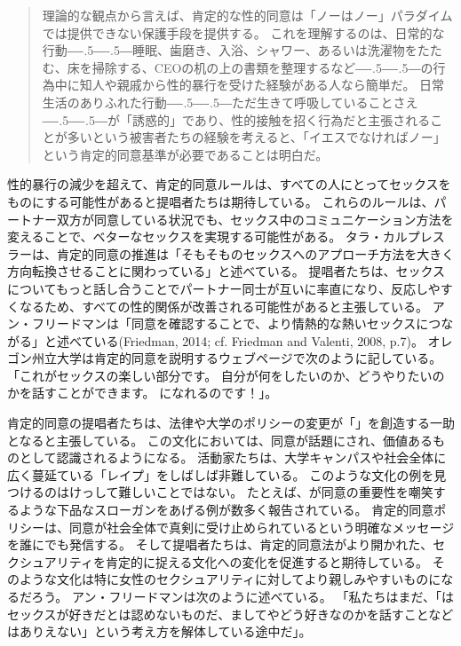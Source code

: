 \documentclass[paper=a4,book,openany]{jlreq}
\newcommand{\ig}[1]{}           %
\def\DDASH{―\kern-.5\zw―\kern-.5\zw―}
\begin{document}
\begin{quote}
  理論的な観点から言えば、肯定的な性的同意は「ノーはノー」パラダイムでは提供できない保護手段を提供する。
これを理解するのは、日常的な行動{\DDASH}睡眠、歯磨き、入浴、シャワー、あるいは洗濯物をたたむ、床を掃除する、CEOの机の上の書類を整理するなど{\DDASH}の行為中に知人や親戚から性的暴行を受けた経験がある人なら簡単だ。
日常生活のありふれた行動{\DDASH}ただ生きて呼吸していることさえ{\DDASH}が「誘惑的」であり、性的接触を招く行為だと主張されることが多いという被害者たちの経験を考えると、「イエスでなければノー」という肯定的同意基準が必要であることは明白だ。
\citep[p.405]{vandervort12:_affir_sexual_consen_canad_law}
\end{quote}

性的暴行の減少を超えて、肯定的同意ルールは、すべての人にとってセックスをものにする可能性があると提唱者たちは期待している。
これらのルールは、パートナー双方が同意している状況でも、セックス中のコミュニケーション方法を変えることで、ベターなセックスを実現する可能性がある。
タラ・カルプレスラーは、肯定的同意の推進は「そもそものセックスへのアプローチ方法を大きく方向転換させることに関わっている」と述べている。
提唱者たちは、セックスについてもっと話し合うことでパートナー同士が互いに率直になり、反応しやすくなるため、すべての性的関係が改善される可能性があると主張している。
アン・フリードマン\ig{Ann Friedman}は「同意を確認することで、より情熱的な熱いセックスにつながる」と述べている(Friedman, 2014; cf. Friedman and Valenti, 2008, p.7)。
\nocite{friedman14:_oh_yes_means_yes}\nocite{friedman08:_yes_means_yes}
オレゴン州立大学は肯定的同意を説明するウェブページで次のように記している。
「これがセックスの楽しい部分です。
自分が何をしたいのか、どうやりたいのかを話すことができます。
になれるのです！」\citep{moyer14:_how_calif_yes_means_yes}。

肯定的同意の提唱者たちは、法律や大学のポリシーの変更が「」を創造する一助となると主張している。
この文化においては、同意が話題にされ、価値あるものとして認識されるようになる。
活動家たちは、大学キャンパスや社会全体に広く蔓延ている「レイプ」をしばしば非難している。
このような文化の例を見つけるのはけっして難しいことではない。
たとえば、が同意の重要性を嘲笑するような下品なスローガンをあげる例が数多く報告されている\citep{jackson18:_frat_barred_yale_years_is_back}。
肯定的同意ポリシーは、同意が社会全体で真剣に受け止められているという明確なメッセージを誰にでも発信する。
そして提唱者たちは、肯定的同意法がより開かれた、セクシュアリティを肯定的に捉える文化への変化を促進すると期待している。
そのような文化は特に女性のセクシュアリティに対してより親しみやすいものになるだろう。
アン・フリードマン\ig{Ann Friedman}は次のように述べている。
「私たちはまだ、「はセックスが好きだとは認めないものだ、ましてやどう好きなのかを話すことなどはありえない」という考え方を解体している途中だ」\citep{friedman14:_oh_yes_means_yes}。
\end{document}
